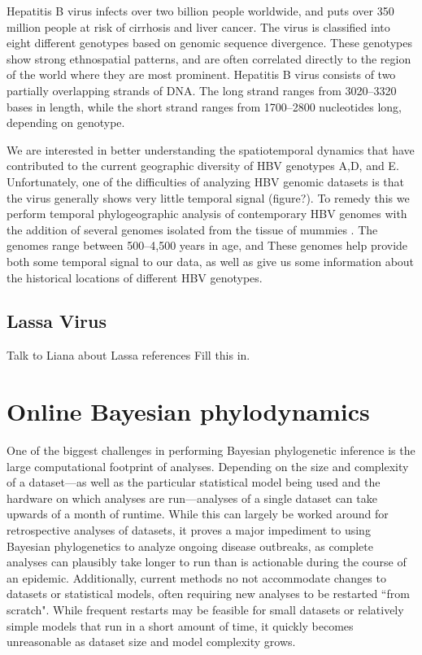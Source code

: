 Hepatitis B virus infects over two billion people worldwide, and puts over 350 million people at risk of cirrhosis and liver cancer\cite{kane1995}.
The virus is classified into eight different genotypes based on genomic sequence divergence.
These genotypes show strong ethnospatial patterns, and are often correlated directly to the region of the world where they are most prominent\cite{schaefer2007}.
Hepatitis B virus consists of two partially overlapping strands of DNA.
The long strand ranges from 3020--3320 bases in length, while the short strand ranges from 1700--2800 nucleotides long, depending on genotype\cite{kay2007_hepatitis_b_virus_genetic_variability}.

We are interested in better understanding the spatiotemporal dynamics that have contributed to the current geographic diversity of HBV genotypes A,D, and E.
Unfortunately, one of the difficulties of analyzing HBV genomic datasets is that the virus generally shows very little temporal signal (figure?).
To remedy this we perform temporal phylogeographic analysis of contemporary HBV genomes with the addition of several genomes isolated from the tissue of mummies \cite{muhlemann, ross}.
The genomes range between 500--4,500 years in age, and
These genomes help provide both some temporal signal to our data, as well as give us some information about the historical locations of different HBV genotypes.

\subsection{Lassa Virus}

Talk to Liana about Lassa references
Fill this in.


\section{Online Bayesian phylodynamics}

One of the biggest challenges in performing Bayesian phylogenetic inference is the large computational footprint of analyses.
Depending on the size and complexity of a dataset---as well as the particular statistical model being used and the hardware on which analyses are run---analyses of a single dataset can take upwards of a month of runtime.
While this can largely be worked around for retrospective analyses of datasets, it proves a major impediment to using Bayesian phylogenetics to analyze ongoing disease outbreaks, as complete analyses can plausibly take longer to run than is actionable during the course of an epidemic.
Additionally, current methods no not accommodate changes to datasets or statistical models, often requiring new analyses to be restarted ``from scratch".
While frequent restarts may be feasible for small datasets or relatively simple models that run in a short amount of time, it quickly becomes unreasonable as dataset size and model complexity grows.

